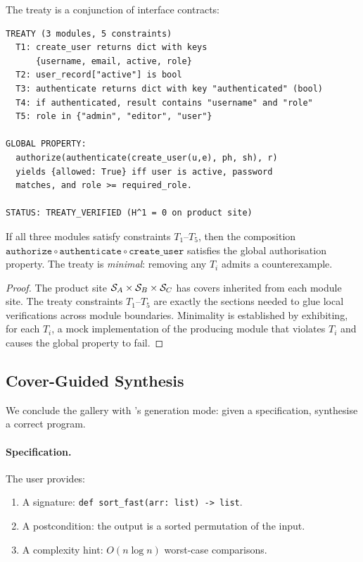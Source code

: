 The treaty is a conjunction of interface contracts:

\begin{lstlisting}[style=jugeo-output,caption={Synthesised treaty.},label={lst:treaty}]
TREATY (3 modules, 5 constraints)
  T1: create_user returns dict with keys
      {username, email, active, role}
  T2: user_record["active"] is bool
  T3: authenticate returns dict with key "authenticated" (bool)
  T4: if authenticated, result contains "username" and "role"
  T5: role in {"admin", "editor", "user"}

GLOBAL PROPERTY:
  authorize(authenticate(create_user(u,e), ph, sh), r)
  yields {allowed: True} iff user is active, password
  matches, and role >= required_role.

STATUS: TREATY_VERIFIED (H^1 = 0 on product site)
\end{lstlisting}

\begin{theorem}\label{thm:treaty}
If all three modules satisfy constraints $T_1$--$T_5$, then the
composition
$\texttt{authorize} \circ \texttt{authenticate} \circ
\texttt{create\_user}$
satisfies the global authorisation property.  The treaty is
\emph{minimal}: removing any $T_i$ admits a counterexample.
\end{theorem}

\begin{proof}
The product site $\mathcal{S}_{A} \times \mathcal{S}_{B} \times \mathcal{S}_{C}$ has
covers inherited from each module site.  The treaty constraints
$T_1$--$T_5$ are exactly the sections needed to glue local
verifications across module boundaries.  Minimality is established
by exhibiting, for each $T_i$, a mock implementation of the
producing module that violates $T_i$ and causes the global
property to fail.
\end{proof}


\subsection{Cover-Guided Synthesis}\label{sec:app-synthesis}

We conclude the gallery with \JuGeo{}'s generation mode: given
a specification, synthesise a correct program.

\paragraph{Specification.}
The user provides:
\begin{enumerate}[nosep]
  \item A signature: \texttt{def sort\_fast(arr: list) -> list}.
  \item A postcondition: the output is a sorted permutation of the
    input.
  \item A complexity hint: $O(n \log n)$ worst-case comparisons.
\end{enumerate}

